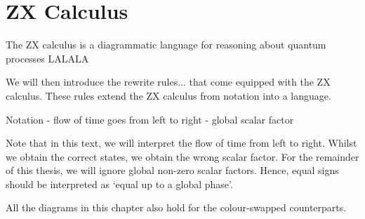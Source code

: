 \chapter{ZX Calculus}%
\label{zx-calculus}

The ZX calculus is a diagrammatic language for reasoning about quantum processes LALALA

We will then introduce the rewrite rules... that come equipped with the ZX calculus. These rules extend the ZX calculus from notation into a language.

Notation
- flow of time goes from left to right
- global scalar factor


Note that in this text, we will interpret the flow of time from left to right.
Whilst we obtain the correct states, we obtain the wrong scalar factor. For the remainder of this thesis, we will ignore global non-zero scalar factors. Hence, equal signs should be interpreted as `equal up to a global phase'.

All the diagrams in this chapter also hold for the colour-swapped counterparts.
